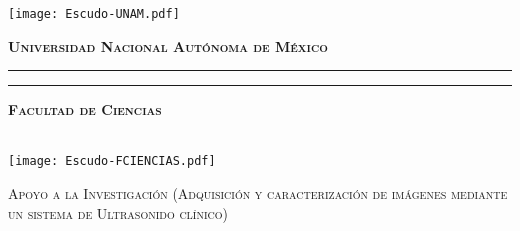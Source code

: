 \documentclass[letterpaper,12pt,oneside]{book}
\begin{document}
    \begin{titlepage}
        \thispagestyle{empty}
        \begin{minipage}[c][0.17\textheight][c]{0.25\textwidth}
            \begin{center}
                \texttt{[image: Escudo-UNAM.pdf]}
            \end{center}
        \end{minipage}
        \begin{minipage}[c][0.195\textheight][t]{0.75\textwidth}
            \begin{center}
                \vspace{0.3cm}
                \textbf{\textsc{\large Universidad Nacional Aut\'onoma de M\'exico}}\\[0.5cm]
                \vspace{0.3cm}
                \hrule height2.5pt
                \vspace{.2cm}
                \hrule height1pt
                \vspace{1.2cm}
                \textbf{\textsc{\large Facultad de Ciencias}}\\[0.5cm] %
            \end{center}
        \end{minipage}

        \begin{minipage}[c][0.81\textheight][t]{0.25\textwidth}
            \vspace*{5mm}
            \begin{center}
                \hskip2.0mm
                \vrule width1pt height13cm 
                \vspace{5mm}
                \hskip2pt
                \vrule width2.5pt height13cm
                \hskip2mm
                \vrule width1pt height13cm \\
                \vspace{5mm}
                \texttt{[image: Escudo-FCIENCIAS.pdf]}
            \end{center}
        \end{minipage}
        \begin{minipage}[c][0.81\textheight][t]{0.75\textwidth}
            \begin{center}
                \vspace{0.5cm}

                {\large\scshape Apoyo a la Investigación (Adquisición y caracterización de imágenes
                mediante un sistema de Ultrasonido clínico)}


\end{center}
\end{minipage}
\end{titlepage}
\end{document}
